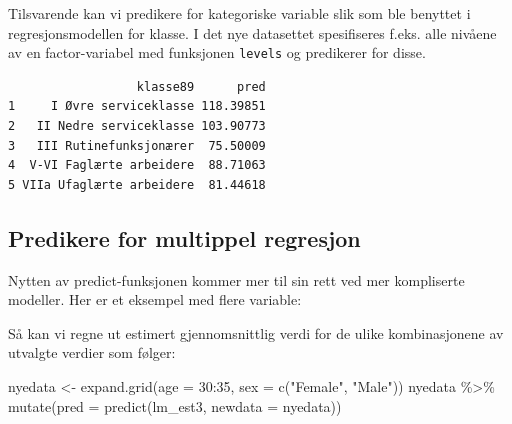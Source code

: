\documentclass[
  norsk,
  letterpaper,
  DIV=11,
  numbers=noendperiod]{scrreprt}
\newenvironment{Shaded}{\begin{snugshade}}{\end{snugshade}}
\newcommand{\AttributeTok}[1]{\textcolor[rgb]{0.40,0.45,0.13}{#1}}
\newcommand{\DecValTok}[1]{\textcolor[rgb]{0.68,0.00,0.00}{#1}}
\newcommand{\FunctionTok}[1]{\textcolor[rgb]{0.28,0.35,0.67}{#1}}
\newcommand{\NormalTok}[1]{\textcolor[rgb]{0.00,0.23,0.31}{#1}}
\newcommand{\OtherTok}[1]{\textcolor[rgb]{0.00,0.23,0.31}{#1}}
\newcommand{\SpecialCharTok}[1]{\textcolor[rgb]{0.37,0.37,0.37}{#1}}
\newcommand{\StringTok}[1]{\textcolor[rgb]{0.13,0.47,0.30}{#1}}
\theoremstyle{definition}
\theoremstyle{remark}
\begin{document}
Tilsvarende kan vi predikere for kategoriske variable slik som ble
benyttet i regresjonsmodellen for klasse. I det nye datasettet
spesifiseres f.eks. alle nivåene av en factor-variabel med funksjonen
\texttt{levels} og predikerer for disse.

\begin{Shaded}
\end{Shaded}

\begin{verbatim}
                  klasse89      pred
1     I Øvre serviceklasse 118.39851
2   II Nedre serviceklasse 103.90773
3   III Rutinefunksjonærer  75.50009
4  V-VI Faglærte arbeidere  88.71063
5 VIIa Ufaglærte arbeidere  81.44618
\end{verbatim}

\subsection{Predikere for multippel
regresjon}\label{predikere-for-multippel-regresjon}

Nytten av predict-funksjonen kommer mer til sin rett ved mer kompliserte
modeller. Her er et eksempel med flere variable:

Så kan vi regne ut estimert gjennomsnittlig verdi for de ulike
kombinasjonene av utvalgte verdier som følger:

\begin{Shaded}
\begin{Highlighting}[]
\NormalTok{nyedata }\OtherTok{\textless{}{-}} \FunctionTok{expand.grid}\NormalTok{(}\AttributeTok{age =} \DecValTok{30}\SpecialCharTok{:}\DecValTok{35}\NormalTok{, }
                      \AttributeTok{sex =} \FunctionTok{c}\NormalTok{(}\StringTok{"Female"}\NormalTok{, }\StringTok{"Male"}\NormalTok{))}
\NormalTok{nyedata }\SpecialCharTok{\%\textgreater{}\%} 
  \FunctionTok{mutate}\NormalTok{(}\AttributeTok{pred =} \FunctionTok{predict}\NormalTok{(lm\_est3, }\AttributeTok{newdata =}\NormalTok{ nyedata))}
\end{Highlighting}
\end{Shaded}
\end{document}
